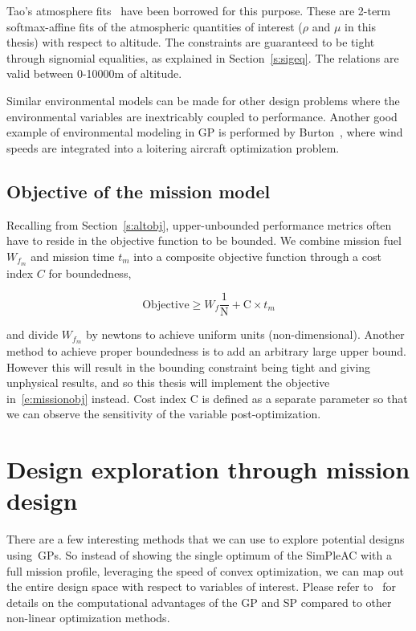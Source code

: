 Tao's atmosphere fits~\cite{tao_thesis} have been borrowed for this purpose. These are
2-term softmax-affine fits of the atmospheric
quantities of interest ($\rho$ and $\mu$ in this thesis) with respect to altitude. The constraints
are guaranteed to be tight through signomial equalities, as explained in Section~\ref{s:sigeq}.
The relations are valid between 0-10000m of altitude.

Similar environmental models can be made for other design problems where the environmental
variables are inextricably coupled to performance. Another good example of environmental modeling
in \gls{GP} is performed by Burton~\cite{gassolar}, where wind speeds are integrated into
a loitering aircraft optimization problem.

\subsection{Objective of the mission model}
\label{s:missionobj}

Recalling from Section~\ref{s:altobj}, upper-unbounded performance metrics often have to
reside in the objective function to be bounded. We combine mission fuel $W_{f_m}$ and mission time $t_m$
into a composite objective function through a cost index $C$ for boundedness,

\begin{equation}
    \mathrm{Objective} \geq W_f \frac{1}{\mathrm{N}} + \mathrm{C} \times t_m
    \label{e:missionobj}
\end{equation}

and divide $W_{f_m}$ by newtons to achieve uniform units (non-dimensional).
Another method to achieve proper boundedness is to add an arbitrary large upper bound. However
this will result in the bounding constraint being tight and giving unphysical results, and so
this thesis will implement the objective in~\ref{e:missionobj} instead.
Cost index $\mathrm{C}$ is defined as a separate parameter so that we can observe the sensitivity
of the variable post-optimization.

\section{Design exploration through mission design}

There are a few interesting methods that we can use to explore
potential designs using~\gls{GP}s. So instead of showing the single optimum of the
SimPleAC with a full mission profile, leveraging the speed of convex optimization,
we can map out the entire design space with respect to variables of interest.
Please refer to~\cite{power_of_log} for details on the computational advantages of the \gls{GP}
and \gls{SP} compared to other non-linear optimization methods.

